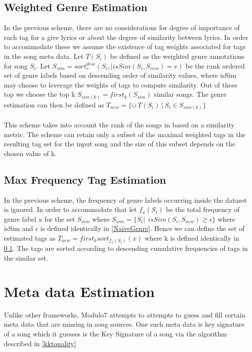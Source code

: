 \subsection{Weighted Genre Estimation} \label{WeightedGenre}

\noindent In the previous scheme, there are no considerations for degree of importance of each tag for a give lyrics or about the degree of similarity between lyrics. In order to accommodate these we assume the existence of tag weights associated for tags in the song meta data. Let $T(S_i)$ be defined as the weighted genre annotations for song $S_i$. Let $S_{sim} = sort_v^{desc}({S_i, | isSim(S_i, S_{new}) = v})$ be the rank ordered set of genre labels based on descending order of similarity values, where isSim may choose to leverage the weights of tags to compute similarity. Out of these top we choose the top k $S_{sim(k)} = first_{k} (S_{sim})$ similar songs. The genre estimation can then be defined as $T_{new} = \{\cup \ T(S_i) \ | \ S_i \in S_{sim(k)}\}$ \\\\
This scheme takes into account the rank of the songs in based on a similarity metric. The scheme can retain only a subset of the maximal weighted tags in the resulting tag set for the input song and the size of this subset depends on the chosen value of k. 

\subsection{Max Frequency Tag Estimation} \label{MaxFrequencyGenre}

\noindent In the previous scheme, the frequency of genre labels occurring inside the dataset is ignored. In order to accommodate that let $f_x(S_i)$ be the total frequency of genre label x for the set $S_{sim}$ where $S_{sim} = \{S_i | \ \ isSim(S_i, S_{new}) \geq \epsilon\}$ where isSim and $\epsilon$ is defined identically in \ref{NaiveGenre}.  Hence we can define the set of estimated tags as $T_{new} = first_{k} sort_{f_x(S_i)}(x)$ where k is defined identically in \ref{WeightedGenre}. The tags are sorted according to descending cumulative frequencies of tags in the similar set. 

\section{Meta data Estimation} \label{metadataestimation}

\noindent Unlike other frameworks, Modulo7 attempts to attempts to guess and fill certain meta data that are missing in song sources. One such meta data is key signature of a song which it guesses is the Key Signature of a song via the algorithm described in \ref{kktonality} 

